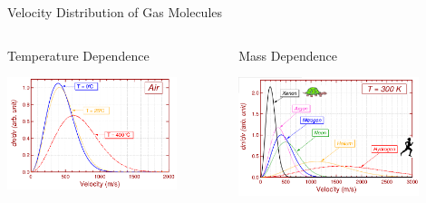 \documentclass[11]{beamer}
\begin{document}
\begin{frame}{Velocity Distribution of Gas Molecules}





 \begin{columns}[t]
    
      
       \begin{exampleblock}{Temperature Dependence}
         \begin{center}
			\includegraphics[width=0.8\textwidth]{VelocityDistributionWithTemp.png}
		\end{center}
       \end{exampleblock}
       
       \begin{exampleblock}{Mass Dependence}
          \begin{center}
				\includegraphics[width=0.8\textwidth]{VelocityDistributionWithMass.png}
		\end{center}    
       
       \end{exampleblock}   
   
    \end{columns}


\end{frame}
\end{document}
